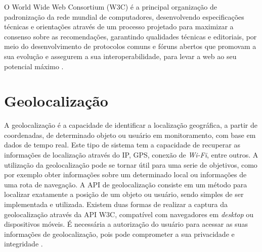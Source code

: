 O World Wide Web Consortium (W3C) é a principal organização de padronização da rede mundial de computadores, desenvolvendo especificações técnicas e orientações através de um processo projetado para maximizar a consenso sobre as recomendações, garantindo qualidades técnicas e editoriais, por meio do desenvolvimento de protocolos comuns e fóruns abertos que promovam a sua evolução e assegurem a sua interoperabilidade, para levar a web ao seu potencial máximo \cite{api:w3c}.

\section{Geolocalização}


A geolocalização é a capacidade de identificar a localização geográfica, a partir de coordenadas, de determinado objeto ou usuário em monitoramento, com base em dados de tempo real. Este tipo de sistema tem a capacidade de recuperar as informações de localização através do IP, GPS, conexão de \textit{Wi-Fi}, entre outros. A utilização da geolocalização pode se tornar útil para uma serie de objetivos, como por exemplo obter informações sobre um determinado local ou informações de uma rota de navegação. A API de geolocalização consiste em um método para localizar exatamente a posição de um objeto ou usuário, sendo simples de ser implementada e utilizada. Existem duas formas de realizar a captura da geolocalização através da API W3C, compatível com navegadores em \textit{desktop} ou dispositivos móveis. É necessária a autorização do usuário para acessar as suas informações de geolocalização, pois pode comprometer a sua privacidade e integridade \cite{geolocalizacao:2011}.

